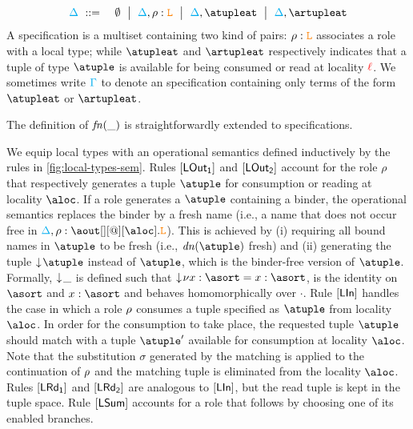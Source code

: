 \begin{eqnarray*}
  \envmv & \bnfdef & \emptyset \bnfmid
                  \envmv, \arole :  \aL \bnfmid
                  \envmv, \atupleat \bnfmid
                  \envmv, \artupleat                  
\end{eqnarray*}
%
A specification is a multiset containing two kind of pairs:  $\rho :  \texttt{\textcolor{orange}L}$   associates a 
role with a local type; while $\atupleat$ and $\artupleat$ respectively indicates that a 
tuple of type $\atuple$ is available for being consumed or read  at locality ${\color{red}\ell}$. 
%
We sometimes write $\textcolor{cyan}{\Gamma}$ to denote an specification containing only
terms of the form $\atupleat$ or $\artupleat$. 

The definition of ${\it fn}(\_)$ is straightforwardly  extended to specifications. 

We equip  local types with an operational semantics defined inductively by 
the rules in \cref{fig:local-types-sem}. Rules $\mathsf{[LOut_1]}$ and $\mathsf{[LOut_2]}$
account  for the role $\rho$ that respectively generates a tuple $\atuple$ for consumption or reading at 
locality $\aloc$. If a role generates a  $\atuple$ containing a binder, the operational semantics
replaces the binder by a fresh name (i.e., a name that does not occur free in $\envmv, \arole : \aout[][@][\aloc].\aL$).
This is achieved by (i) requiring all bound names in $\atuple$ to be fresh (i.e., $\dn\atuple$  fresh) and 
(ii) generating the tuple $\eraseB\atuple$ instead of $\atuple$, which is the binder-free version of $\atuple$. 
Formally, $\downarrow\!{\_}$ is defined  such that 
$\eraseB{\nu x:\asort} = x : \asort$,  is the identity on $\asort$ and $x : \asort$ and behaves 
homomorphically over $\cdot$. Rule $\mathsf{[LIn]}$ handles the case in which a role $\rho$
consumes  a tuple specified as $\atuple$ from locality $\aloc$. In order for the consumption to
take place, the  requested tuple $\atuple$ should match with a tuple $\atuple'$ available 
for consumption at locality $\aloc$. 
Note that the substitution $\sigma$ generated by the matching is applied 
to the continuation of $\rho$ and the matching tuple is eliminated from the locality $\aloc$. 
%
Rules $\mathsf{[LRd_1]}$ and $\mathsf{[LRd_2]}$ are analogous to $\mathsf{[LIn]}$, but the 
read tuple is kept in the tuple space.
%
Rule $\mathsf{[LSum]}$ accounts for a role that follows by choosing one of 
its enabled branches. 


